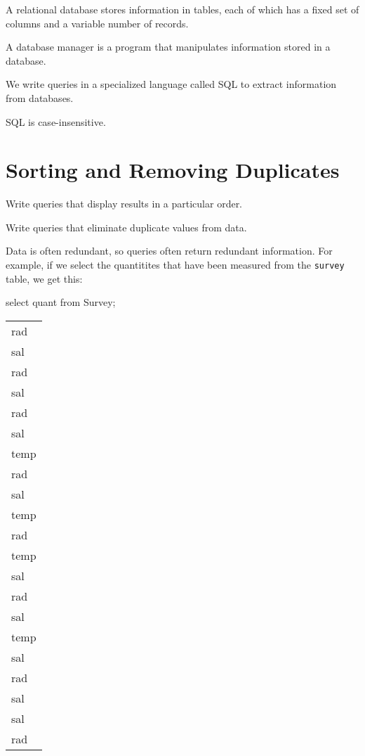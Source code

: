 \documentclass{book}
\begin{document}
\begin{keypoints}
\begin{swcitemize}
\item
  A relational database stores information in tables, each of which has
  a fixed set of columns and a variable number of records.
\item
  A database manager is a program that manipulates information stored in
  a database.
\item
  We write queries in a specialized language called SQL to extract
  information from databases.
\item
  SQL is case-insensitive.
\end{swcitemize}
\end{keypoints}

\section{Sorting and Removing Duplicates}

\begin{objectives}
\begin{swcitemize}
\item
  Write queries that display results in a particular order.
\item
  Write queries that eliminate duplicate values from data.
\end{swcitemize}
\end{objectives}

Data is often redundant, so queries often return redundant information.
For example, if we select the quantitites that have been measured from
the \texttt{survey} table, we get this:

\begin{VerbIn}
\end{VerbIn}

\begin{VerbIn}
select quant from Survey;
\end{VerbIn}

\begin{tabular}{l}
rad \\
sal \\
rad \\
sal \\
rad \\
sal \\
temp \\
rad \\
sal \\
temp \\
rad \\
temp \\
sal \\
rad \\
sal \\
temp \\
sal \\
rad \\
sal \\
sal \\
rad \\
\end{tabular}
\end{document}
